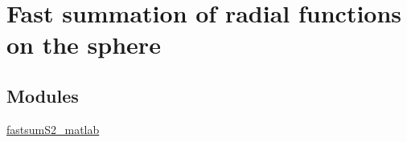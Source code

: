 \hypertarget{group__applications__fastsumS2}{
\section{Fast summation of radial functions on the sphere}
\label{group__applications__fastsumS2}
}
\subsection*{Modules}
\begin{CompactItemize}
\item 
\hyperlink{group__applications__fastsumS2__test}{fastsumS2\_\-matlab}
\end{CompactItemize}
